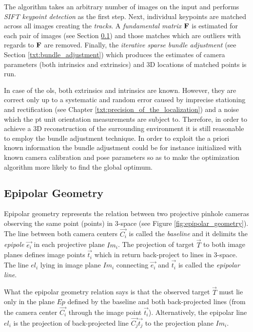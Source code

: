 The algorithm takes an arbitrary number of images on the input and performs \textit{SIFT keypoint detection} as the first step. Next, individual keypoints are matched across all images creating the \textit{tracks}. A \textit{fundamental matrix $\mathbf{F}$} is estimated for each pair of images (see Section \ref{txt:epipolar_geometry}) and those matches which are outliers with regards to $\mathbf{F}$ are removed. Finally, the \textit{iterative sparse bundle adjustment} (see Section \ref{txt:bundle_adjustment}) which produces the estimates of camera parameters (both intrinsics and extrinsics) and 3D locations of matched points is run.

In case of the \gls{ols}, both extrinsics and intrinsics are known. However, they are correct only up to a systematic and random error caused by imprecise stationing and rectification (see Chapter \ref{txt:precision_of_the_localization}) and a noise which the \gls{pt} unit orientation measurements are subject to. Therefore, in order to achieve a 3D reconstruction of the surrounding environment it is still reasonable to employ the bundle adjustment technique. In order to exploit the a priori known information the bundle adjustment could be for instance initialized with known camera calibration and pose parameters so as to make the optimization algorithm more likely to find the global optimum.

\subsection{Epipolar Geometry} \label{txt:epipolar_geometry}

Epipolar geometry represents the relation between two projective pinhole cameras observing the same point (points) in 3-space \cite{Cyganek:2007:ICV:1214366} (see Figure \ref{fig:epipolar_geometry}). The line between both camera centers $\vec{C_{i}}$ is called the \textit{baseline} and it delimits the \textit{epipole} $ \vec{e_{i}}$ in each projective plane $Im_{i}$. The projection of target $\vec{T}$ to both image planes defines image points $\vec{t_{i}}$ which in return back-project to lines in 3-space. The line $el_{i}$ lying in image plane $Im_{i}$ connecting $\vec{e_{i}}$ and ${\vec{t_{i}}}$ is called the \textit{epipolar line}.

What the epipolar geometry relation says is that the observed target $\vec{T}$ must lie only in the plane $Ep$ defined by the baseline and both back-projected lines (from the camera center $\vec{C_{i}}$ through the image point $\vec{t_{i}}$). Alternatively, the epipolar line $el_{i}$ is the projection of back-projected line $\vec{C_{j}}\vec{t_{j}}$ to the projection plane $Im_{i}$.

